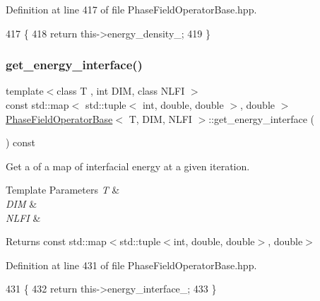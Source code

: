Definition at line 417 of file Phase\+Field\+Operator\+Base.\+hpp.


\begin{DoxyCode}
417                                                                \{
418   \textcolor{keywordflow}{return} this->energy\_density\_;
419 \}
\end{DoxyCode}
\mbox{\label{classPhaseFieldOperatorBase_ac194823660f85a12d8edcf4520bbc025}} 
\subsubsection{\texorpdfstring{get\+\_\+energy\+\_\+interface()}{get\_energy\_interface()}}
{\footnotesize\ttfamily template$<$class T , int D\+IM, class N\+L\+FI $>$ \\
const std\+::map$<$ std\+::tuple$<$ int, double, double $>$, double $>$ \hyperlink{classPhaseFieldOperatorBase}{Phase\+Field\+Operator\+Base}$<$ T, D\+IM, N\+L\+FI $>$\+::get\+\_\+energy\+\_\+interface (\begin{DoxyParamCaption}{ }\end{DoxyParamCaption}) const}



Get a of a map of interfacial energy at a given iteration. 


\begin{DoxyTemplParams}{Template Parameters}
{\em T} & \\
\hline
{\em D\+IM} & \\
\hline
{\em N\+L\+FI} & \\
\hline
\end{DoxyTemplParams}
\begin{DoxyReturn}{Returns}
const std\+::map$<$std\+::tuple$<$int, double, double$>$, double$>$ 
\end{DoxyReturn}


Definition at line 431 of file Phase\+Field\+Operator\+Base.\+hpp.


\begin{DoxyCode}
431                                                                  \{
432   \textcolor{keywordflow}{return} this->energy\_interface\_;
433 \}
\end{DoxyCode}
\mbox{\label{classPhaseFieldOperatorBase_adc993d94274e82bc06f9555fbecbd310}} 

